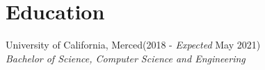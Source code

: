 \documentclass[./Resume.tex]{subfiles}
\begin{document}
\section{Education}
University of California, Merced\null\hfill(2018 - \emph{Expected} May 2021)\\
           \emph{Bachelor of Science, Computer Science and Engineering}
\end{document}
